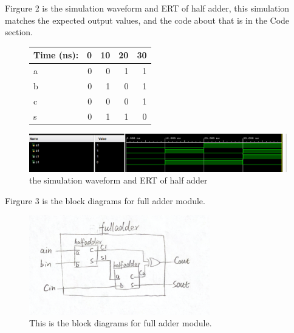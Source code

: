 \documentclass[11pt]{article}
\begin{document}
Firgure 2 is the simulation waveform and ERT of half adder, this simulation matches the expected output values, and the code about that is in the Code section. \\
\begin{figure}[ht]\centering
	\begin{tabular}{l|rrrr}
		Time (ns): & 0 & 10 & 20 & 30 \\
		\midrule
		a & 0 & 0 & 1 & 1 \\
		b & 0 & 1 & 0 & 1 \\
		\midrule
		c & 0 & 0 & 0 & 1 \\
		s & 0 & 1 & 1 & 0 \\
		\bottomrule
	\end{tabular}\medskip
		
	\includegraphics[width=1\textwidth]{HalfAdderSimulation}
	\caption{the simulation waveform and ERT of half adder}
	\label{fig:HalfAdderSimulation}
\end{figure}

Firgure 3 is the block diagrams for full adder module. \\
\begin{figure}[ht]\centering    
	\includegraphics[width=0.7\textwidth]{fulladder}    
	\caption{This is the block diagrams for full adder module.}    
	\label{fig:fulladder}
\end{figure}
\end{document}
